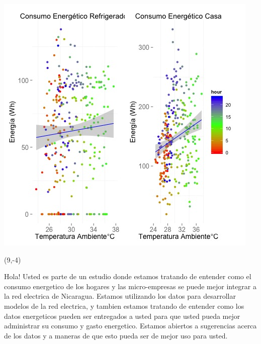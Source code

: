 \documentclass{article}\usepackage[]{graphicx}\usepackage[]{color}
\newenvironment{knitrout}{}{} %
\begin{document}
\begin{knitrout}
\color{fgcolor}
\includegraphics[scale=0.75]{figure/A22_correlaciones} 
\end{knitrout}

 \begin{textblock}{1}(9,-4)
\begin{minipage}{20em}
\begingroup

\endgroup
\end{minipage}
\end{textblock}

\vspace{70px}
\begin{knitrout}
Hola! Usted es parte de un estudio donde estamos tratando de entender como el consumo energetico de los hogares y las micro-empresas se puede mejor integrar a la red electrica de Nicaragua. Estamos utilizando los datos para desarrollar modelos de la red electrica, y tambien estamos tratando de entender como los datos energeticos pueden ser entregados a usted para que usted pueda mejor administrar su consumo y gasto energetico.  Estamos abiertos a sugerencias acerca de los datos y a maneras de que esto pueda ser de mejor uso para usted.
\end{knitrout}
\end{document}
